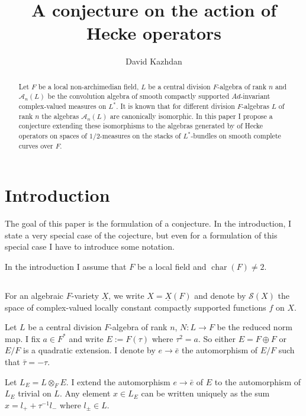 \documentclass[11pt,a4paper,twoside]{amsart}
\theoremstyle{definition}
\newcommand{\mcA}{\mathcal A}
\newcommand{\mcS}{\mathcal S}
\newcommand{\un}{\underline}
\newcommand{\sms}{\smallskip}
\begin{document}
\title[]{A conjecture on the action of Hecke operators }
\author{David Kazhdan} \maketitle



\begin{abstract}
Let $F$ be a local non-archimedian field,   $L$ be a central division $F$-algebra of rank $n$ and $\mcA _n(L)$ be the convolution algebra of smooth  compactly supported $Ad$-invariant complex-valued measures on $L^\ast$. It is known that for different division $F$-algebras $L$ of rank $n$ the algebras  $\mcA _n(L)$ are canonically isomorphic. In this paper I propose a conjecture extending these isomorphisms to the algebras generated by
of Hecke operators  on  spaces of  $1/2$-measures on the stacks of $L^\ast$-bundles on smooth complete curves over $F$.


\end{abstract}

\section{Introduction}
The goal of this paper is the formulation of a  conjecture. In the introduction, I state  a very special case of the cojecture, but even for  a formulation of this special case 
I have to introduce some notation. 

\sms

In the introduction I assume that  $F$ be a local field and $\operatorname{char}(F) \neq 2$. 

\subsection{}

For an algebraic $F$-variety $\un X$, we write $X = \un X(F)$ and denote by $\mcS (X)$ the space of complex-valued locally constant compactly supported functions $f$ on $X$.

\sms

Let $L$ be a central division $F$-algebra of rank $n$, $N : L \to F$ be the reduced norm map. I fix  $a \in F^\ast$ and write $E := F(\tau)$ where $\tau^2 = a$. So either $E = F \oplus F$ or $E/F$ is a quadratic extension. I denote by $e \to \bar e$ the automorphism of $E/F$ such that $\bar{\tau} = -\tau$.

\sms

Let $L_E = L \otimes_F E$. I extend the automorphism $e \to \bar e$ of $E$ to the automorphism of $L_E$ trivial on $L$. Any element $x \in L_E$ can be written uniquely as the sum $x = l_+ + \tau^{-1}l_-$ where $l_\pm \in L$.
\end{document}
